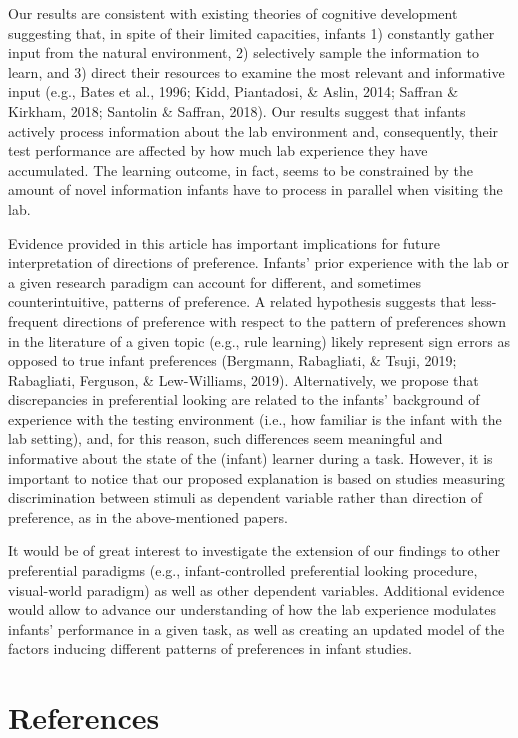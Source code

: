\documentclass[english,man]{apa6}
\begin{document}
Our results are consistent with existing theories of cognitive development suggesting that, in spite of their limited capacities, infants 1) constantly gather input from the natural environment, 2) selectively sample the information to learn, and 3) direct their resources to examine the most relevant and informative input (e.g., Bates et al., 1996; Kidd, Piantadosi, \& Aslin, 2014; Saffran \& Kirkham, 2018; Santolin \& Saffran, 2018). Our results suggest that infants actively process information about the lab environment and, consequently, their test performance are affected by how much lab experience they have accumulated. The learning outcome, in fact, seems to be constrained by the amount of novel information infants have to process in parallel when visiting the lab.

Evidence provided in this article has important implications for future interpretation of directions of preference. Infants' prior experience with the lab or a given research paradigm can account for different, and sometimes counterintuitive, patterns of preference. A related hypothesis suggests that less-frequent directions of preference with respect to the pattern of preferences shown in the literature of a given topic (e.g., rule learning) likely represent sign errors as opposed to true infant preferences (Bergmann, Rabagliati, \& Tsuji, 2019; Rabagliati, Ferguson, \& Lew-Williams, 2019). Alternatively, we propose that discrepancies in preferential looking are related to the infants' background of experience with the testing environment (i.e., how familiar is the infant with the lab setting), and, for this reason, such differences seem meaningful and informative about the state of the (infant) learner during a task. However, it is important to notice that our proposed explanation is based on studies measuring discrimination between stimuli as dependent variable rather than direction of preference, as in the above-mentioned papers.

It would be of great interest to investigate the extension of our findings to other preferential paradigms (e.g., infant-controlled preferential looking procedure, visual-world paradigm) as well as other dependent variables. Additional evidence would allow to advance our understanding of how the lab experience modulates infants' performance in a given task, as well as creating an updated model of the factors inducing different patterns of preferences in infant studies.

\newpage

\hypertarget{references}{%
\section{References}\label{references}}
\end{document}
